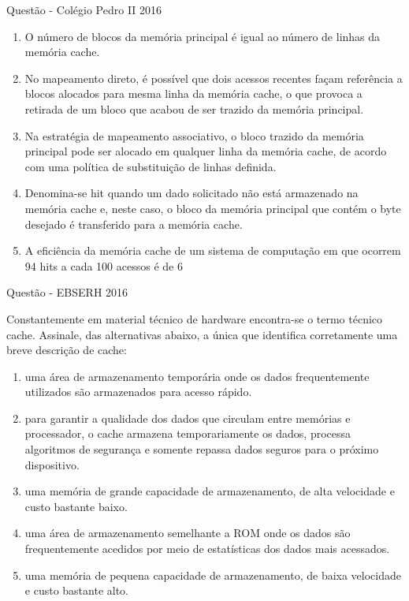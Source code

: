 \documentclass[aspectratio=169,
				xcolor=table]{beamer}
\begin{document}
	\begin{frame}{Questão - Colégio Pedro II 2016}
		\begin{enumerate}[I]
			\item O número de blocos da memória principal é igual ao número de linhas da memória cache.
			\item No mapeamento direto, é possível que dois acessos recentes façam referência a blocos alocados para mesma linha da memória cache, o que provoca a retirada de um bloco que acabou de ser trazido da memória principal.
			\item Na estratégia de mapeamento associativo, o bloco trazido da memória principal pode ser alocado em qualquer linha da memória cache, de acordo com uma política de substituição de linhas definida.
			\item Denomina-se hit quando um dado solicitado não está armazenado na memória cache e, neste caso, o bloco da memória principal que contém o byte desejado é transferido para a memória cache.
			\item A eficiência da memória cache de um sistema de computação em que ocorrem 94 hits a cada 100 acessos é de 6%
		\end{enumerate}
			
	
		\end{frame}	


		\begin{frame}{Questão - EBSERH 2016}
		
		Constantemente em material técnico de hardware encontra-se o termo técnico cache. Assinale, das alternativas abaixo, a única que identifica corretamente uma breve descrição de cache: 
		
		\begin{enumerate}[a]
			\item uma área de armazenamento temporária onde os dados frequentemente utilizados são armazenados para acesso rápido.
			\item 	para garantir a qualidade dos dados que circulam entre memórias e processador, o cache armazena temporariamente os dados, processa algoritmos de segurança e somente repassa dados seguros para o próximo dispositivo. 
			\item uma memória de grande capacidade de armazenamento, de alta velocidade e custo bastante baixo.
			\item uma área de armazenamento semelhante a ROM onde os dados são frequentemente acedidos por meio de estatísticas dos dados mais acessados.
			\item uma memória de pequena capacidade de armazenamento, de baixa velocidade e custo bastante alto.		
		\end{enumerate}



		
		\end{frame}
	
	
\end{document}
